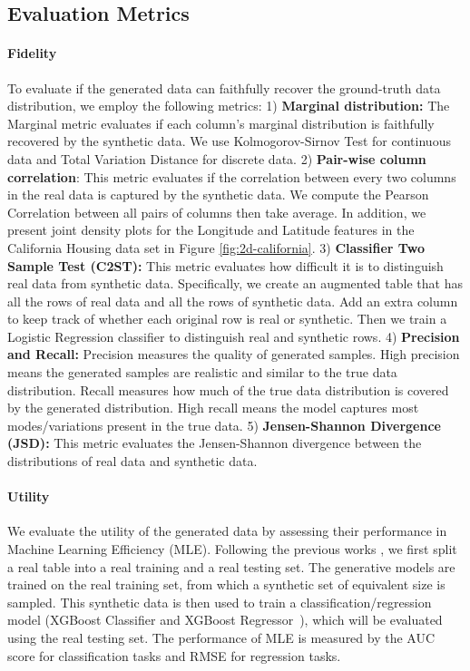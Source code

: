 \subsection{Evaluation Metrics} \label{appendix:metrics}
\paragraph{Fidelity}
To evaluate if the generated data can faithfully recover the ground-truth data distribution, we employ the following metrics: 
1) \textbf{Marginal distribution:} The Marginal metric evaluates if each column's marginal distribution is faithfully recovered by the
synthetic data. We use Kolmogorov-Sirnov Test for continuous data and Total Variation Distance for discrete data.
2) \textbf{Pair-wise column correlation}: This metric evaluates if the correlation between every two columns in the real data is captured by the synthetic data. We compute the Pearson Correlation between all pairs of columns then take average. In addition, we present joint density plots for the Longitude and Latitude features in the California Housing data set in Figure \ref{fig:2d-california}.  
3) \textbf{Classifier Two Sample Test (C2ST):} This metric evaluates how difficult it is to distinguish real data from synthetic data. Specifically, we create an augmented table that has all the rows of real data and all the rows of synthetic data. Add an extra column to keep track of whether each original row is real or synthetic. Then we train a Logistic Regression classifier to distinguish real and synthetic rows. 
4) \textbf{Precision and Recall:} Precision measures the quality of generated samples. High precision means the generated samples are realistic and similar to the true data distribution. Recall measures how much of the true data distribution is covered by the generated distribution. High recall means the model captures most modes/variations present in the true data.
5) \textbf{Jensen-Shannon Divergence (JSD):} This metric evaluates the Jensen-Shannon divergence \citep{jsd} between the distributions of real data and synthetic data.


\paragraph{Utility} 
We evaluate the utility of the generated data by assessing their performance in Machine Learning Efficiency (MLE). Following the previous works \cite{tabsyn},  we first split a real table into a real training and a real testing set. The generative models are trained on the real training set, from which a synthetic set of equivalent size is sampled. This synthetic data is then used to train a classification/regression model (XGBoost Classifier and XGBoost Regressor~\citep{xgboost}), which will be evaluated using the real testing set. The performance of MLE is measured by the AUC score for classification tasks and RMSE for regression tasks.

